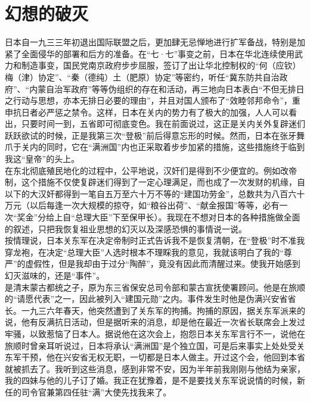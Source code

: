 \fancyhead[RO]{} %
\fancyhead[LE]{} %
\chapter*{幻想的破灭}
\thispagestyle{empty}
日本自一九三三年初退出国际联盟之后，更加肆无忌惮地进行扩军备战，特别是加紧了全面侵华的部署和后方的准备。在“七·七”事变之前，日本在华北连续使用武力和制造事变，国民党南京政府步步屈服，签订了出让华北控制权的“何（应钦）梅（津）协定”、“秦（德纯）土（肥原）协定”等密约，听任“冀东防共自治政府”、“内蒙自治军政府”等等伪组织的存在和活动，再三地向日本表白“不但无排日之行动与思想，亦本无排日必要的理由”，并且对国人颁布了“效睦邻邦命令”，重申抗日者必严惩之禁令。这样，日本在关内的势力有了极大的加强，人人可以看出，只要时间一到，五省即可彻底变色。我在前面说过，这正是关内关外复辟迷们跃跃欲试的时候，正是我第三次“登极”前后得意忘形的时候。然而，日本在张牙舞爪于关内的同时，它在“满洲国”内也正采取着步步加紧的措施，这些措施终于临到我这“皇帝”的头上。\\

在东北彻底殖民地化的过程中，公平地说，汉奸们是得到不少便宜的。例如改帝制，这个措施不仅使复辟迷们得到了一定心理满足，而也成了一次发财的机缘，自以下的大汉奸都得到一笔自五万至六十万不等的“建国功劳金”，总数共为八百六十万元（以后每逢一次大规模的掠夺，如“粮谷出荷”、“献金报国”等等，必有一次“奖金”分给上自“总理大臣”下至保甲长）。我现在不想对日本的各种措施做全面的叙述，只把我恢复祖业思想的幻灭以及深感恐惧的事情说一说。\\

按情理说，日本关东军在决定帝制时正式告诉我不是恢复清朝，在“登极”时不准我穿龙袍，在决定“总理大臣”人选时根本不理睬我的意见，我就该明白了我的“尊严”的虚假性，但是我却由于过分“陶醉”，竟没有因此而清醒过来。使我开始感到幻灭滋味的，还是“事件”。\\

是清末蒙古都统之子，原为东三省保安总司令部和蒙古宣抚使署顾问。他是在旅顺的“请愿代表”之一，因此被列入“建国元勋”之内。事件发生时他是伪满兴安省省长。一九三六年春天，他突然遭到了关东军的拘捕。拘捕的原因，据关东军派来的说，他有反满抗日活动，但是据听来的消息，却是他在最近一次省长联席会上发过牢骚，以致惹恼了日本人。据说他在这次会上，抱怨日本关东军言行不一，说他在旅顺时曾亲耳听说过，日本将承认“满洲国”是个独立国，可是后来事实上处处受关东军干预，他在兴安省无权无职，一切都是日本人做主。开过这个会，他回到本省就被抓去了。我听到这些消息，感到非常不安，因为半年前我刚刚与他结为亲家，我的四妹与他的儿子订了婚。我正在犹豫着，是不是要找关东军说说情的时候，新任的司令官兼第四任驻“满”大使先找我来了。\\

